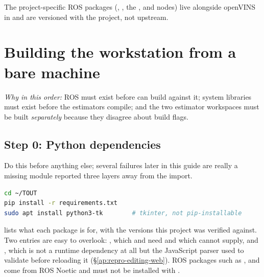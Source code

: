\noindent The project-specific ROS packages (,
, the ,  and
 nodes) live alongside openVINS in
 and are versioned with the project, not upstream.

\section{Building the workstation from a bare machine}
\label{ap:repro-build}
\emph{Why in this order:} ROS must exist before  can build against
it; system libraries must exist before the estimators compile; and the two
estimator workspaces must be built \emph{separately} because they disagree
about build flags.

\subsection{Step 0: Python dependencies}
\label{ap:repro-pydeps}
Do this before anything else; several failures later in this guide are really
a missing module reported three layers away from the import.
\begin{lstlisting}[language=bash]
cd ~/TOUT
pip install -r requirements.txt
sudo apt install python3-tk        # tkinter, not pip-installable
\end{lstlisting}
 lists what each package is for, with the versions this
project was verified against. Two entries are easy to overlook:
, which  and
 need and which  cannot supply, and
, which is not a runtime dependency at all but the JavaScript
parser used to validate  before reloading it
(\S\ref{ap:repro-editing-web}). ROS packages such as ,
 and  come from ROS Noetic and must not be
installed with .

